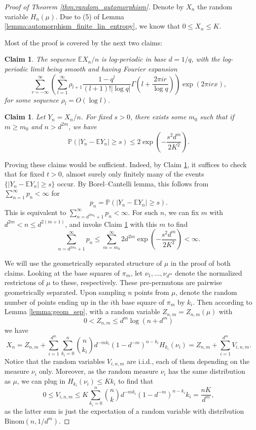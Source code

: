 \documentclass[11pt]{article}
\newcommand{\PP}{\mathbb{P}}
\newcommand{\EE}{\mathbb{E}}
\newtheorem{claim}[theorem]{Claim}
\theoremstyle{definition}
\begin{document}
\begin{proof}[Proof of Theorem \ref{thm:random_automorphism}]
    Denote by $X_n$ the random variable $H_n(\mu)$. Due to (5) of Lemma \ref{lemma:automorphism_finite_lin_entropy}, we know that $0\leq X_n \leq K$.
    
    Most of the proof is covered by the next two claims:
    \begin{claim}\label{claim:conv_of_means}
        The sequence $\EE X_n /n$ is log-periodic in base $d=1/q$, with the log-periodic limit being smooth and having Fourier expansion
        $$\sum_{r=-\infty}^{\infty}\left(\sum_{l=1}^{\infty}\rho_{l+1}\frac{1-q^l}{(l+1)! |\log q|}\Gamma\left(l+\frac{2\pi i r}{\log q}\right)\right)\exp (2\pi i r x),$$
        for some sequence $\rho_l = O(\log l)$.
    \end{claim}
    \begin{claim}\label{claim:large_dev_principle}
        Let $Y_n = X_n/n$. For fixed $s>0$, there exists some $m_0$ such that if $m\geq m_0$ and $n>d^{2m}$, we have
        $$\PP\left(\left| Y_n - \EE Y_n\right|\geq s\right)\leq 2\exp\left(-\frac{s^2 d^m}{2K^2}\right).$$
    \end{claim}
    Proving these claims would be sufficient. Indeed, by Claim \ref{claim:conv_of_means}, it suffices to check that for fixed $t>0$, almost surely only finitely many of the events $\{ \left| Y_n - \EE Y_n\right|\geq s\}$ occur. By Borel--Cantelli lemma, this follows from $\sum_{n=1}^{\infty}p_n<\infty$ for
    $$p_n = \PP\left(\left| Y_n - \EE Y_n\right|\geq s\right).$$
    This is equivalent to $\sum_{n=d^{2m_0}+1}^{\infty}p_n<\infty$. For such $n$, we can fix $m$ with $d^{2m}<n\leq d^{2(m+1)}$, and invoke Claim \ref{claim:large_dev_principle} with this $m$ to find
    $$\sum_{n=d^{2m_0}+1}^{\infty}p_n\leq \sum_{m=m_0}^{\infty}2d^{2m} \exp\left(-\frac{s^2 d^m}{2K^2}\right)<\infty.$$

    We will use the geometrically separated structure of $\mu$ in the proof of both claims. Looking at the base squares of $\pi_m$, let $\nu_{1}, ..., \nu_{d^m}$ denote the normalized restrictons of $\mu$ to these, respectively. These pre-permutons are pairwise geometrically separated. Upon sampling $n$ points from $\mu$, denote the random number of points ending up in the $i$th base square of $\pi_m$ by $k_i$. Then according to Lemma \ref{lemma:geom_sep}, with a random variable $Z_{n,m}=Z_{n,m}(\mu)$ with $$0<Z_{n, m}\leq d^m\log (n+d^m)$$
    we have
    \begin{equation}\label{eq:entropy_decomp}
    X_n = Z_{n, m} + \sum_{i=1}^{d^m} \sum_{k_i=0}^{n}\binom{n}{k_i} d^{-mk_i}(1-d^{-m})^{n-k_i}H_{k_i}(\nu_i)=Z_{n, m} + \sum_{i=1}^{d^m}V_{i, n, m}.
    \end{equation}
    Notice that the random variables $V_{i, n, m}$ are i.i.d., each of them depending on the measure $\nu_i$ only. Moreover, as the random measure $\nu_i$ has the same distribution as $\mu$, we can plug in $H_{k_i}(\nu_i)\leq K k_i$ to find that
    $$0\leq V_{i, n, m} \leq K \sum_{k_i=0}^{n}\binom{n}{k} d^{-mk_i}(1-d^{-m})^{n-k_i} k_i= \frac{nK}{d^m},$$
    as the latter sum is just the expectation of a random variable with distribution $\mathrm{Binom}(n, 1/d^m).$ 


\end{proof}
\end{document}
